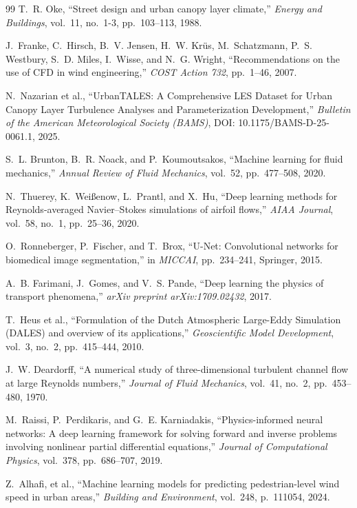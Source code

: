 \documentclass[10pt,twocolumn]{article}
\begin{document}
\begin{thebibliography}{99}
T.~R. Oke, ``Street design and urban canopy layer climate,'' \textit{Energy and Buildings}, vol.~11, no.~1-3, pp.~103--113, 1988.

J.~Franke, C.~Hirsch, B.~V. Jensen, H.~W. Kr{\"u}s, M.~Schatzmann, P.~S. Westbury, S.~D. Miles, I.~Wisse, and N.~G. Wright, ``Recommendations on the use of CFD in wind engineering,'' \textit{COST Action 732}, pp.~1--46, 2007.

N.~Nazarian et al., ``UrbanTALES: A Comprehensive LES Dataset for Urban Canopy Layer Turbulence Analyses and Parameterization Development,'' \textit{Bulletin of the American Meteorological Society (BAMS)}, DOI: 10.1175/BAMS-D-25-0061.1, 2025.

S.~L. Brunton, B.~R. Noack, and P.~Koumoutsakos, ``Machine learning for fluid mechanics,'' \textit{Annual Review of Fluid Mechanics}, vol.~52, pp.~477--508, 2020.

N.~Thuerey, K.~Wei{\ss}enow, L.~Prantl, and X.~Hu, ``Deep learning methods for Reynolds-averaged Navier--Stokes simulations of airfoil flows,'' \textit{AIAA Journal}, vol.~58, no.~1, pp.~25--36, 2020.

O.~Ronneberger, P.~Fischer, and T.~Brox, ``U-Net: Convolutional networks for biomedical image segmentation,'' in \textit{MICCAI}, pp.~234--241, Springer, 2015.

A.~B. Farimani, J.~Gomes, and V.~S. Pande, ``Deep learning the physics of transport phenomena,'' \textit{arXiv preprint arXiv:1709.02432}, 2017.

T.~Heus et al., ``Formulation of the Dutch Atmospheric Large-Eddy Simulation (DALES) and overview of its applications,'' \textit{Geoscientific Model Development}, vol.~3, no.~2, pp.~415--444, 2010.

J.~W. Deardorff, ``A numerical study of three-dimensional turbulent channel flow at large Reynolds numbers,'' \textit{Journal of Fluid Mechanics}, vol.~41, no.~2, pp.~453--480, 1970.

M.~Raissi, P.~Perdikaris, and G.~E. Karniadakis, ``Physics-informed neural networks: A deep learning framework for solving forward and inverse problems involving nonlinear partial differential equations,'' \textit{Journal of Computational Physics}, vol.~378, pp.~686--707, 2019.

Z.~Alhafi, et al., ``Machine learning models for predicting pedestrian-level wind speed in urban areas,'' \textit{Building and Environment}, vol.~248, p.~111054, 2024.
\end{thebibliography}
\end{document}
